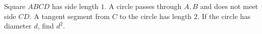 Square $ABCD$ has side length $1$. A circle passes through $A,B$ and does not meet side $CD$. A tangent segment from $C$ to the circle has length $2$. If the circle has diameter $d$, find $d^2$.
